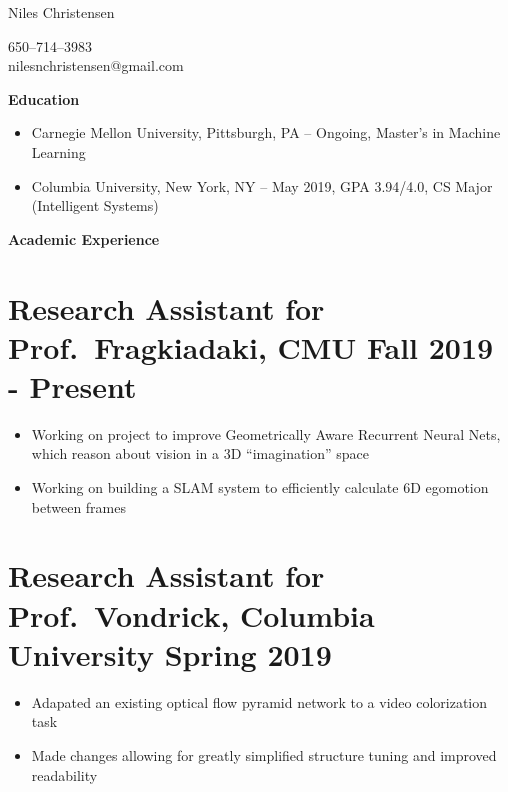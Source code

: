 \documentclass{article}
\newenvironment{tightcenter}{%
  \setlength\topsep{0pt}
  \setlength\parskip{0pt}
  \begin{center}
}{%
  \end{center}
}
\begin{document}
\begin{tightcenter}
\begin{Large}Niles Christensen\\
\end{Large}
\begin{small}
650--714--3983\\
nilesnchristensen@gmail.com
\end{small}
\end{tightcenter}

\noindent
\large{\textbf{Education}}
\begin{itemize}[noitemsep]
    \item Carnegie Mellon University, Pittsburgh, PA -- Ongoing, Master's in Machine Learning
    \item Columbia University, New York, NY -- May 2019, GPA 3.94/4.0, CS Major (Intelligent Systems)
\end{itemize}

\noindent
\large{\textbf{Academic Experience}}

\section*{\textbf{Research Assistant for Prof.\ Fragkiadaki, CMU \hfill Fall 2019 - Present}}
\begin{itemize}[noitemsep]
  \item Working on project to improve Geometrically Aware Recurrent Neural Nets, which reason about vision in a 3D ``imagination'' space
  \item Working on building a SLAM system to efficiently calculate 6D egomotion between frames
\end{itemize}

\section*{\textbf{Research Assistant for Prof.\ Vondrick, Columbia University \hfill	Spring 2019}}
\begin{itemize}[noitemsep]
    \item Adapated an existing optical flow pyramid network to a video colorization task
    \item Made changes allowing for greatly simplified structure tuning and improved readability
\end{itemize}
\end{document}
